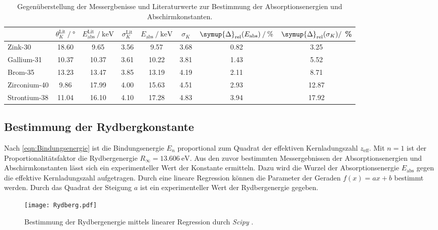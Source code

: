 \begin{table}
  \centering
  \caption{Gegenüberstellung der Messergbenisse und Literaturwerte zur Bestimmung der Absorptionsenergien und Abschirmkonstanten.}
  \label{tab:Absorption}
  \begin{tabular}{l S[table-format = 2.2] S S[table-format = 1.2] S[table-format = 2.2] S[table-format = 1.2] S S[table-format = 2.2]}
    \toprule
     {} & {$\theta^\text{Lit}_K \mathbin{/} \unit{\degree}$} & {$E^\text{Lit}_\text{abs} \mathbin{/} \unit{\kilo\electronvolt}$} &%
     {$\sigma^\text{Lit}_K$} & {$E_\text{abs} \mathbin{/} \unit{\kilo\electronvolt}$} & {$\sigma_K$} & {$\symup{\Delta}_\text{rel}(E_\text{abs}) \mathbin{/} \%$} &%
     {$\symup{\Delta}_\text{rel}(\sigma_K) \mathbin{/}$ \%}\\
    \midrule
      {Zink-30}      & 18.60 &  9.65 & 3.56 &  9.57 & 3.68 & 0.82 &  3.25 \\ 
      {Gallium-31}   & 10.37 & 10.37 & 3.61 & 10.22 & 3.81 & 1.43 &  5.52 \\
      {Brom-35}      & 13.23 & 13.47 & 3.85 & 13.19 & 4.19 & 2.11 &  8.71 \\
      {Zirconium-40} &  9.86 & 17.99 & 4.00 & 15.63 & 4.51 & 2.93 & 12.87 \\
      {Strontium-38} & 11.04 & 16.10 & 4.10 & 17.28 & 4.83 & 3.94 & 17.92 \\
    \bottomrule
  \end{tabular}
\end{table}

\subsection{Bestimmung der Rydbergkonstante}
\label{subsec:Rydberg}
Nach \autoref{eqn:Bindungsenergie} ist die Bindungsenergie $E_n$ proportional zum Quadrat der effektiven Kernladungszahl $z_\text{eff}$. Mit $n = 1$ ist der 
Proportionalitätsfaktor die Rydbergenergie $R_\infty = \qty{13.606}{\electronvolt}$. Aus den zuvor bestimmten Messergebnissen der Absorptionsenergien und 
Abschirmkonstanten lässt sich ein experimenteller Wert der Konstante ermitteln. Dazu wird die Wurzel der Absorptionsenergie $E_\text{abs}$ gegen die effektive
Kernladungszahl aufgetragen. Durch eine lineare Regression können die Parameter der Geraden $f(x) = ax + b$ bestimmt werden. Durch das Quadrat der Steigung $a$ 
ist ein experimenteller Wert der Rydbergenergie gegeben.

\begin{figure}
  \centering
  \texttt{[image: Rydberg.pdf]}
  \caption{Bestimmung der Rydbergenergie mittels linearer Regression durch \textit{Scipy} \cite{scipy}.}
  \label{fig:Rydberg}
\end{figure}

